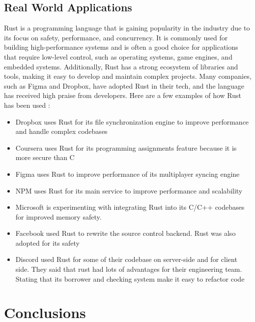 \documentclass{article}
\theoremstyle{theorem}
\theoremstyle{definition}
\theoremstyle{remark}
\begin{document}
\subsection{Real World Applications}
Rust is a programming language that is gaining popularity in the industry due to its focus on safety, performance, and concurrency. It is commonly used for building high-performance systems and is often a good choice for applications that require low-level control, such as operating systems, game engines, and embedded systems. Additionally, Rust has a strong ecosystem of libraries and tools, making it easy to develop and maintain complex projects. Many companies, such as Figma and Dropbox, have adopted Rust in their tech, and the language has received high praise from developers. Here are a few examples of how Rust has been used \cite{9 Companies}:
\begin{itemize}
\item Dropbox uses Rust for its file synchronization engine to improve performance and handle complex codebases
\item Coursera uses Rust for its programming assignments feature because it is more secure than C
\item Figma uses Rust to improve performance of its multiplayer syncing engine
\item NPM uses Rust for its main service to improve performance and scalability
\item Microsoft is experimenting with integrating Rust into its C/C++ codebases for improved memory safety.
\item Facebook used Rust to rewrite the source control backend. Rust was also adopted for its safety
\item Discord used Rust for some of their codebase on server-side and for client side. They said that rust had lots of advantages for their engineering team. Stating that its borrower and checking system make it easy to refactor code
\end{itemize}


\section{Conclusions}\label{conclusions}
\end{document}
